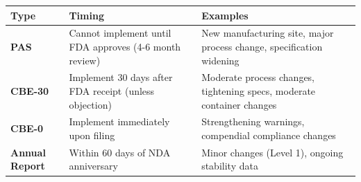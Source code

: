 \documentclass[
  11pt,
  a4paper,
]{report}
\begin{document}
\begin{longtable}[]{@{}lll@{}}
\toprule
\begin{minipage}[b]{0.24\columnwidth}\raggedright
Type\strut
\end{minipage} & \begin{minipage}[b]{0.32\columnwidth}\raggedright
Timing\strut
\end{minipage} & \begin{minipage}[b]{0.36\columnwidth}\raggedright
Examples\strut
\end{minipage}\tabularnewline
\midrule
\endhead
\begin{minipage}[t]{0.24\columnwidth}\raggedright
\textbf{PAS}\strut
\end{minipage} & \begin{minipage}[t]{0.32\columnwidth}\raggedright
Cannot implement until FDA approves (4-6 month review)\strut
\end{minipage} & \begin{minipage}[t]{0.36\columnwidth}\raggedright
New manufacturing site, major process change, specification
widening\strut
\end{minipage}\tabularnewline
\begin{minipage}[t]{0.24\columnwidth}\raggedright
\textbf{CBE-30}\strut
\end{minipage} & \begin{minipage}[t]{0.32\columnwidth}\raggedright
Implement 30 days after FDA receipt (unless objection)\strut
\end{minipage} & \begin{minipage}[t]{0.36\columnwidth}\raggedright
Moderate process changes, tightening specs, moderate container
changes\strut
\end{minipage}\tabularnewline
\begin{minipage}[t]{0.24\columnwidth}\raggedright
\textbf{CBE-0}\strut
\end{minipage} & \begin{minipage}[t]{0.32\columnwidth}\raggedright
Implement immediately upon filing\strut
\end{minipage} & \begin{minipage}[t]{0.36\columnwidth}\raggedright
Strengthening warnings, compendial compliance changes\strut
\end{minipage}\tabularnewline
\begin{minipage}[t]{0.24\columnwidth}\raggedright
\textbf{Annual Report}\strut
\end{minipage} & \begin{minipage}[t]{0.32\columnwidth}\raggedright
Within 60 days of NDA anniversary\strut
\end{minipage} & \begin{minipage}[t]{0.36\columnwidth}\raggedright
Minor changes (Level 1), ongoing stability data\strut
\end{minipage}\tabularnewline
\bottomrule
\end{longtable}
\end{document}
